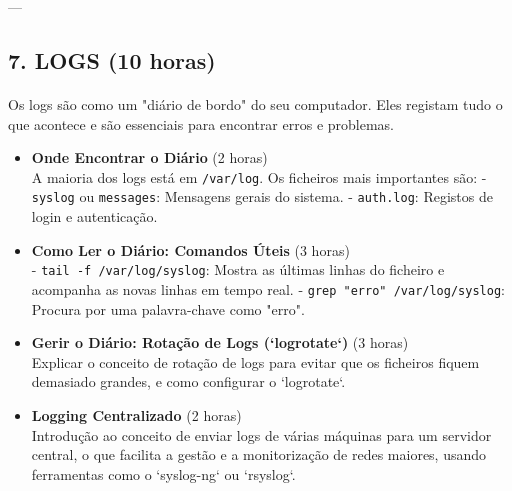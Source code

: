 \documentclass[10pt,a4paper]{article}
\begin{document}
	
	---
	
	\subsection*{7. LOGS (10 horas)}
	\vspace{-1.2em}
	\paragraph{}
	Os logs são como um "diário de bordo" do seu computador. Eles registam tudo o que acontece e são essenciais para encontrar erros e problemas.
	
	\begin{itemize}
		\item \textbf{Onde Encontrar o Diário} (2 horas) \\
		A maioria dos logs está em \texttt{/var/log}. Os ficheiros mais importantes são:
		- \texttt{syslog} ou \texttt{messages}: Mensagens gerais do sistema.
		- \texttt{auth.log}: Registos de login e autenticação.
		
		\item \textbf{Como Ler o Diário: Comandos Úteis} (3 horas) \\
		- \texttt{tail -f /var/log/syslog}: Mostra as últimas linhas do ficheiro e acompanha as novas linhas em tempo real.
		- \texttt{grep "erro" /var/log/syslog}: Procura por uma palavra-chave como "erro".
		
		\item \textbf{Gerir o Diário: Rotação de Logs (`logrotate`)} (3 horas) \\
		Explicar o conceito de rotação de logs para evitar que os ficheiros fiquem demasiado grandes, e como configurar o `logrotate`.
		
		\item \textbf{Logging Centralizado} (2 horas) \\
		Introdução ao conceito de enviar logs de várias máquinas para um servidor central, o que facilita a gestão e a monitorização de redes maiores, usando ferramentas como o `syslog-ng` ou `rsyslog`.
		
	\end{itemize}
	
\end{document}
